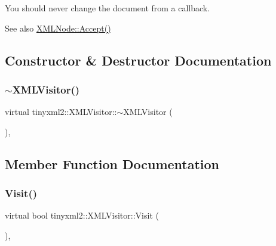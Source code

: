 You should never change the document from a callback.

\begin{DoxySeeAlso}{See also}
\hyperlink{classtinyxml2_1_1_x_m_l_node_a81e66df0a44c67a7af17f3b77a152785}{X\+M\+L\+Node\+::\+Accept()} 
\end{DoxySeeAlso}


\subsection{Constructor \& Destructor Documentation}
\mbox{\label{classtinyxml2_1_1_x_m_l_visitor_a494e72033d646c47d9c65c502ec62364}} 
\subsubsection{\texorpdfstring{$\sim$\+X\+M\+L\+Visitor()}{~XMLVisitor()}}
{\footnotesize\ttfamily virtual tinyxml2\+::\+X\+M\+L\+Visitor\+::$\sim$\+X\+M\+L\+Visitor (\begin{DoxyParamCaption}{ }\end{DoxyParamCaption})\hspace{0.3cm}{\ttfamily [inline]}, {\ttfamily [virtual]}}



\subsection{Member Function Documentation}
\mbox{\label{classtinyxml2_1_1_x_m_l_visitor_adc75bd459fc7ba8223b50f0616767f9a}} 
\subsubsection{\texorpdfstring{Visit()}{Visit()}\hspace{0.1cm}{\footnotesize\ttfamily [1/4]}}
{\footnotesize\ttfamily virtual bool tinyxml2\+::\+X\+M\+L\+Visitor\+::\+Visit (\begin{DoxyParamCaption}\item[{const \hyperlink{classtinyxml2_1_1_x_m_l_declaration}{X\+M\+L\+Declaration} \&}]{ }\end{DoxyParamCaption})\hspace{0.3cm}{\ttfamily [inline]}, {\ttfamily [virtual]}}



